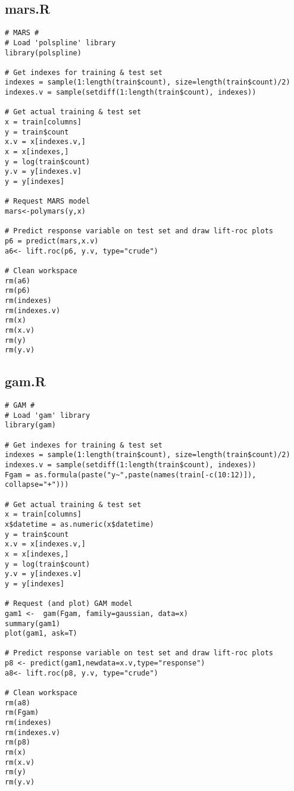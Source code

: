 \subsection{mars.R}\label{sec:mars-script}
\begin{verbatim}
# MARS #
# Load 'polspline' library
library(polspline)

# Get indexes for training & test set
indexes = sample(1:length(train$count), size=length(train$count)/2)
indexes.v = sample(setdiff(1:length(train$count), indexes))

# Get actual training & test set
x = train[columns]
y = train$count
x.v = x[indexes.v,]
x = x[indexes,]
y = log(train$count)
y.v = y[indexes.v]
y = y[indexes]

# Request MARS model
mars<-polymars(y,x)

# Predict response variable on test set and draw lift-roc plots
p6 = predict(mars,x.v)
a6<- lift.roc(p6, y.v, type="crude")

# Clean workspace
rm(a6)
rm(p6)
rm(indexes)
rm(indexes.v)
rm(x)
rm(x.v)
rm(y)
rm(y.v)
\end{verbatim}

\subsection{gam.R}\label{sec:gam-script}
\begin{verbatim}
# GAM #
# Load 'gam' library
library(gam)

# Get indexes for training & test set
indexes = sample(1:length(train$count), size=length(train$count)/2)
indexes.v = sample(setdiff(1:length(train$count), indexes))
Fgam = as.formula(paste("y~",paste(names(train[-c(10:12)]), collapse="+")))

# Get actual training & test set
x = train[columns]
x$datetime = as.numeric(x$datetime)
y = train$count
x.v = x[indexes.v,]
x = x[indexes,]
y = log(train$count)
y.v = y[indexes.v]
y = y[indexes]

# Request (and plot) GAM model
gam1 <-  gam(Fgam, family=gaussian, data=x)
summary(gam1)
plot(gam1, ask=T)

# Predict response variable on test set and draw lift-roc plots
p8 <- predict(gam1,newdata=x.v,type="response")
a8<- lift.roc(p8, y.v, type="crude")

# Clean workspace
rm(a8)
rm(Fgam)
rm(indexes)
rm(indexes.v)
rm(p8)
rm(x)
rm(x.v)
rm(y)
rm(y.v)
\end{verbatim}

